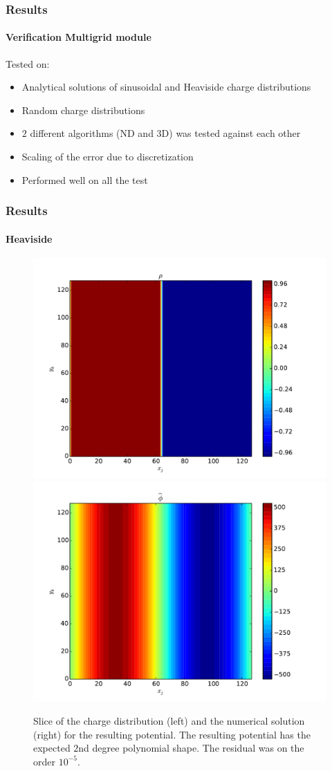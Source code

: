 \documentclass{beamer}
\begin{document}
\begin{frame}
	\frametitle{Results}
	\framesubtitle{Verification Multigrid module}
	Tested on:
	\begin{itemize}
		\item Analytical solutions of sinusoidal and Heaviside charge distributions
		\item Random charge distributions
		\item \(2\) different algorithms (ND and 3D) was tested against each other
		\item Scaling of the error due to discretization
		\item Performed well on all the test
	\end{itemize}
\end{frame}
\begin{frame}
	\frametitle{Results}
	\framesubtitle{Heaviside}
		\begin{figure}
		\includegraphics[scale = 0.3]{figures/verification/rho}
		\includegraphics[scale = 0.3]{figures/verification/numerical}
		\caption{Slice of the charge distribution (left) and the numerical solution (right) for the resulting potential. The
		resulting potential has the expected \(2\)nd degree polynomial shape. The residual was on the order \(10^{-5}\).}
		\end{figure}
\end{frame}
\end{document}
